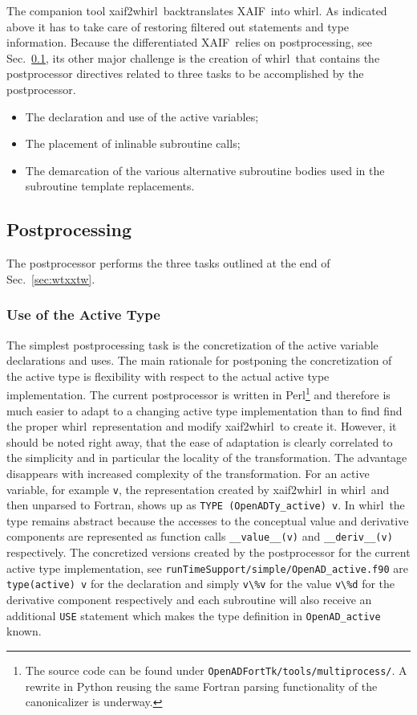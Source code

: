 \documentclass{book}
\newcommand{\xaif}{XAIF}
\newcommand{\whirl}{whirl}
\newcommand{\xaifTowhirl}{xaif2whirl}
\newcommand{\refsec}[1]{{Sec.~\ref{#1}}}
\begin{document}
The companion tool \xaifTowhirl\ backtranslates \xaif\ into \whirl. 
As indicated above it has to take care of restoring filtered out 
statements and type information. Because the differentiated \xaif\ 
relies on postprocessing, see \refsec{sec:PostProcessor}, 
its other major challenge is the 
creation of \whirl\ that contains the postprocessor directives related to
three tasks to be accomplished by the postprocessor. 
\begin{itemize} 
\item The declaration and use of the active variables;
\item The placement of inlinable subroutine calls;
\item The demarcation of the various alternative subroutine bodies used in the subroutine template replacements.
\end{itemize}  

\subsection{Postprocessing}\label{sec:PostProcessor}
The postprocessor performs the three tasks outlined at the end of \refsec{sec:wtxxtw}.

\subsubsection{Use of the Active Type}\label{sec:activeType}
The simplest postprocessing task is the concretization of the active variable declarations 
and uses. The main rationale for postponing the concretization of the active type is flexibility 
with respect to the actual active type implementation. The current postprocessor is 
written in Perl\footnote{ 
The source code can be found under \lstinline{OpenADFortTk/tools/multiprocess/}.
A rewrite in Python reusing the same Fortran parsing functionality of the canonicalizer is underway.
}
and therefore is much easier to adapt to a changing active type implementation than to 
find find the proper \whirl\ representation and modify \xaifTowhirl\ to create it.
However, it should be noted right away, that the ease of adaptation is clearly correlated to the 
simplicity and in particular the locality of the transformation. The advantage disappears with 
increased complexity of the transformation.   
For an active variable, for example  \lstinline{v},  the representation created 
by \xaifTowhirl\ in \whirl\ and then unparsed to Fortran,
shows up as \lstinline{TYPE (OpenADTy_active) v}. 
In \whirl\ the type remains abstract because the accesses to the conceptual value and derivative components 
are represented as function calls \lstinline{__value__(v)} and \lstinline{__deriv__(v)} respectively.
The concretized versions created by the postprocessor for the current active type implementation, 
see \lstinline{runTimeSupport/simple/OpenAD_active.f90} are 
\lstinline{type(active) v} for the declaration and simply \lstinline{v\%v} for the value \lstinline{v\%d} for 
the derivative component respectively and each subroutine will also receive an additional 
\lstinline{USE} statement which makes the type definition in \lstinline{OpenAD_active} known. 
\end{document}
